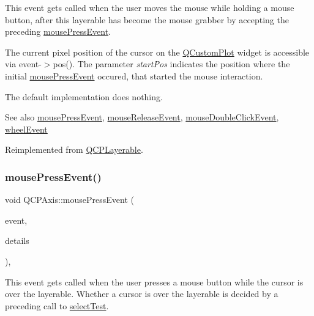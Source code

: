 This event gets called when the user moves the mouse while holding a mouse button, after this layerable has become the mouse grabber by accepting the preceding \hyperlink{class_q_c_p_axis_ac89c068873ee9197a5d2af715bdc1105}{mouse\+Press\+Event}.

The current pixel position of the cursor on the \hyperlink{class_q_custom_plot}{Q\+Custom\+Plot} widget is accessible via {\ttfamily event-\/$>$pos()}. The parameter {\itshape start\+Pos} indicates the position where the initial \hyperlink{class_q_c_p_axis_ac89c068873ee9197a5d2af715bdc1105}{mouse\+Press\+Event} occured, that started the mouse interaction.

The default implementation does nothing.

\begin{DoxySeeAlso}{See also}
\hyperlink{class_q_c_p_axis_ac89c068873ee9197a5d2af715bdc1105}{mouse\+Press\+Event}, \hyperlink{class_q_c_p_axis_a35663b938ad83e91c0b8e59dbc8c6b18}{mouse\+Release\+Event}, \hyperlink{class_q_c_p_layerable_a4171e2e823aca242dd0279f00ed2de81}{mouse\+Double\+Click\+Event}, \hyperlink{class_q_c_p_axis_a71643d27524a843230b5ba68085b3d9b}{wheel\+Event} 
\end{DoxySeeAlso}


Reimplemented from \hyperlink{class_q_c_p_layerable_a9eee1ba47fd69be111059ca3881933e4}{Q\+C\+P\+Layerable}.

\mbox{\label{class_q_c_p_axis_ac89c068873ee9197a5d2af715bdc1105}} 
\subsubsection{\texorpdfstring{mouse\+Press\+Event()}{mousePressEvent()}}
{\footnotesize\ttfamily void Q\+C\+P\+Axis\+::mouse\+Press\+Event (\begin{DoxyParamCaption}\item[{Q\+Mouse\+Event $\ast$}]{event,  }\item[{const Q\+Variant \&}]{details }\end{DoxyParamCaption})\hspace{0.3cm}{\ttfamily [protected]}, {\ttfamily [virtual]}}

This event gets called when the user presses a mouse button while the cursor is over the layerable. Whether a cursor is over the layerable is decided by a preceding call to \hyperlink{class_q_c_p_axis_a63b7103c57fe9acfbce164334ea837f8}{select\+Test}.

